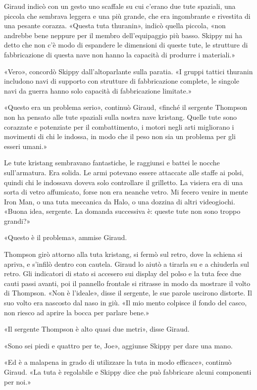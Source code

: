 Giraud indicò con un gesto uno scaffale su cui c'erano due tute
spaziali, una piccola che sembrava leggera e una più grande, che era
ingombrante e rivestita di una pesante corazza. «Questa tuta thuranin»,
indicò quella piccola, «non andrebbe bene neppure per il membro
dell'equipaggio più basso. Skippy mi ha detto che non c'è modo di
espandere le dimensioni di queste tute, le strutture di fabbricazione di
questa nave non hanno la capacità di produrre i materiali.»

«Vero», concordò Skippy dall'altoparlante sulla paratia. «I gruppi
tattici thuranin includono navi di supporto con strutture di
fabbricazione complete, le singole navi da guerra hanno solo capacità di
fabbricazione limitate.»

«Questo era un problema serio», continuò Giraud, «finché il sergente
Thompson non ha pensato alle tute spaziali sulla nostra nave kristang.
Quelle tute sono corazzate e potenziate per il combattimento, i motori
negli arti migliorano i movimenti di chi le indossa, in modo che il peso
non sia un problema per gli esseri umani.»

Le tute kristang sembravano fantastiche, le raggiunsi e battei le nocche
sull'armatura. Era solida. Le armi potevano essere attaccate alle staffe
ai polsi, quindi chi le indossava doveva solo controllare il grilletto.
La visiera era di una sorta di vetro affumicato, forse non era neanche
vetro. Mi fecero venire in mente Iron Man, o una tuta meccanica da Halo,
o una dozzina di altri videogiochi. «Buona idea, sergente. La domanda
successiva è: queste tute non sono troppo grandi?»

«Questo è il problema», ammise Giraud.

Thompson girò attorno alla tuta kristang, si fermò sul retro, dove la
schiena si apriva, e s'infilò dentro con cautela. Giraud lo aiutò a
tirarla su e a chiuderla sul retro. Gli indicatori di stato si accesero
sui display del polso e la tuta fece due cauti passi avanti, poi il
pannello frontale si ritrasse in modo da mostrare il volto di Thompson.
«Non è l'ideale», disse il sergente, le sue parole uscirono distorte. Il
suo volto era nascosto dal naso in giù. «Il mio mento colpisce il fondo
del casco, non riesco ad aprire la bocca per parlare bene.»

«Il sergente Thompson è alto quasi due metri», disse Giraud.

«Sono sei piedi e quattro per te, Joe», aggiunse Skippy per dare una
mano.

«Ed è a malapena in grado di utilizzare la tuta in modo efficace»,
continuò Giraud. «La tuta è regolabile e Skippy dice che può fabbricare
alcuni componenti per noi.»

